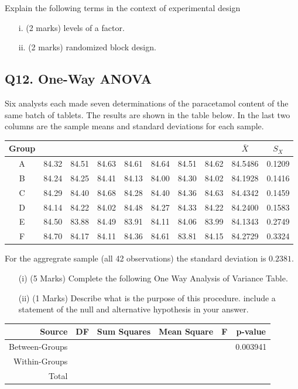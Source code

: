 \documentclass[a4paper,12pt]{article}
\begin{document}

Explain the following terms in the context of experimental design
	\begin{itemize}
		\item[i.] (2 marks) levels of a factor.
		\item[ii.] (2 marks) randomized block design.
	\end{itemize}
	
\subsection*{Q12. One-Way ANOVA } %
Six analysts each made seven determinations of the paracetamol content of the same batch of tablets.
The results are shown in the table below. In the last two columns are the sample means and standard deviations for each sample.\\
\bigskip

	\begin{tabular}{|c|ccccccc|c|c|}
		\hline
		Group &  & &  &  &  &  &  & $\bar{X}$& $S_{X}$ \\ \hline
		A & 84.32 & 84.51 & 84.63 & 84.61 & 84.64 & 84.51 & 84.62 & 84.5486 & 0.1209 \\ \hline
		B & 84.24 & 84.25 & 84.41 & 84.13 & 84.00 & 84.30 & 84.02 & 84.1928 & 0.1416 \\ \hline
		C & 84.29 & 84.40 & 84.68 & 84.28 & 84.40 & 84.36 & 84.63 & 84.4342 & 0.1459 \\ \hline
		D & 84.14 & 84.22 & 84.02 & 84.48 & 84.27 & 84.33 & 84.22 & 84.2400 & 0.1583 \\ \hline
		E & 84.50 & 83.88 & 84.49 & 83.91 & 84.11 & 84.06 & 83.99 & 84.1343 & 0.2749 \\ \hline
		F & 84.70 & 84.17 & 84.11 & 84.36 & 84.61 & 83.81 & 84.15 & 84.2729 & 0.3324 \\ \hline
	\end{tabular} 
	


\bigskip
For the aggregrate sample (all 42 observations) the standard deviation is $0.2381$.

\begin{itemize}
	\item[(i)] (5 Marks) Complete the following One Way Analysis of Variance Table.
	\item[(ii)] (1 Marks) Describe what is the purpose of this procedure. include a statement of the null and alternative hypothesis in your answer.
\end{itemize}
\begin{tabular}{|r|c|c|c|c|c|}
	\hline Source  &\phantom{sp} DF \phantom{sp} & Sum Squares & Mean Square  & \phantom{sp} F \phantom{sp} & p-value  \\ 
	\hline Between-Groups &  &  &  &  & 0.003941 \\ 
	\hline Within-Groups &  &  &  &  &  \\ \hline
	\hline Total &  &  &  &  &  \\ 
	\hline 
\end{tabular} 
\end{document}
